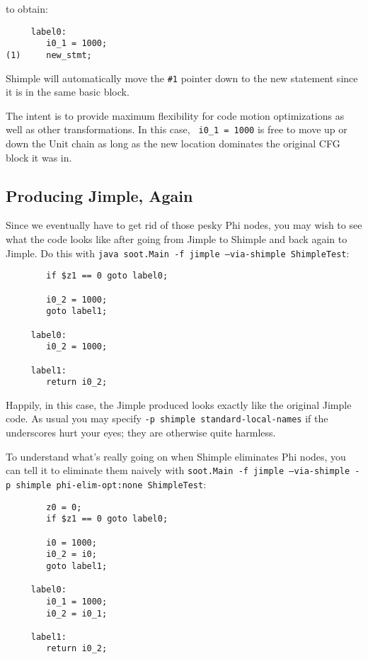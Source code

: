 \documentclass[10pt,letterpaper,oneside,onecolumn]{article}
\begin{document}
to obtain:

\begin{verbatim}
     label0:
        i0_1 = 1000;
(1)     new_stmt;
\end{verbatim}

Shimple will automatically move the {\tt \#1} pointer down to the new
statement since it is in the same basic block.

The intent is to provide maximum flexibility for code motion
optimizations as well as other transformations.  In this case, {\tt
i0\_1 = 1000} is free to move up or down the Unit chain as long as the
new location dominates the original CFG block it was in.

\subsection{Producing Jimple, Again}

Since we eventually have to get rid of those pesky Phi nodes, you
may wish to see what the code looks like after going from Jimple to
Shimple and back again to Jimple.  Do this with {\tt java soot.Main -f
jimple --via-shimple ShimpleTest}:

\begin{verbatim}
        if $z1 == 0 goto label0;

        i0_2 = 1000;
        goto label1;

     label0:
        i0_2 = 1000;

     label1:
        return i0_2;
\end{verbatim}

Happily, in this case, the Jimple produced looks exactly like the
original Jimple code.  As usual you may specify {\tt -p shimple
standard-local-names} if the underscores hurt your eyes; they are
otherwise quite harmless.

To understand what's really going on when Shimple eliminates Phi
nodes, you can tell it to eliminate them naively with {\tt soot.Main
-f jimple --via-shimple -p shimple phi-elim-opt:none ShimpleTest}:

\begin{verbatim}
        z0 = 0;
        if $z1 == 0 goto label0;

        i0 = 1000;
        i0_2 = i0;
        goto label1;

     label0:
        i0_1 = 1000;
        i0_2 = i0_1;

     label1:
        return i0_2;
\end{verbatim}
\end{document}
